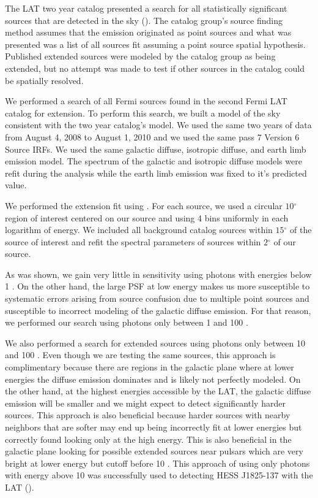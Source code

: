 \documentclass[12pt,preprint]{aastex}
\newcommand{\gev}{\text{GeV}\xspace}
\renewcommand{\deg}{\ensuremath{^\circ}\xspace}
\newcommand{\pointlike}{\text{\em pointlike}\xspace}
\begin{document}
The LAT two year catalog presented a search for all statistically
significant sources that are detected in the \gev sky (\cite{second_cat}).
The catalog group's source finding method assumes that the emission
originated as point sources and what was presented was a list of all
sources fit assuming a point source spatial hypothesis.  Published
extended sources were modeled by the catalog group as being extended,
but no attempt was made to test if other sources in the catalog could
be spatially resolved.

We performed a search of all Fermi sources found in the second Fermi LAT
catalog for extension.  To perform this search, we built a model of the
sky consistent with the two year catalog's model.   We used the same two
years of data from August 4, 2008 to August 1, 2010 and we used the same
pass 7 Version 6 Source IRFs.  We used the same galactic diffuse,
isotropic diffuse, and earth limb emission model. The spectrum of the
galactic and isotropic diffuse models were refit during the analysis
while the earth limb emission was fixed to it's predicted value.

We performed the extension fit using \pointlike.  For each source, we
used a circular $10\deg$ region of interest centered on our source and
using 4 bins uniformly in each logarithm of energy.  We included all
background catalog sources within $15\deg$ of the source of interest
and refit the spectral parameters of sources within $2\deg$ of our source.

As was shown, we gain very little in sensitivity using photons with energies
below 1 \gev. On the other hand, the large PSF at low energy makes us
more susceptible to systematic errors arising from source confusion due
to multiple point sources and susceptible to incorrect modeling of the
galactic diffuse emission.  For that reason, we performed our search
using photons only between 1 \gev and 100 \gev.

We also performed a search for extended sources using photons only between
10 \gev and 100 \gev. Even though we are testing the same sources, this
approach is complimentary because there are regions in the galactic
plane where at lower energies the diffuse emission dominates and is
likely not perfectly modeled. On the other hand, at the highest energies
accessible by the LAT, the galactic diffuse emission will be smaller and
we might expect to detect significantly harder sources. This approach is
also beneficial because harder sources with nearby neighbors that are
softer may end up being incorrectly fit at lower energies but correctly
found looking only at the high energy.  This is also beneficial in the
galactic plane looking for possible extended sources near pulsars which
are very bright at lower energy but cutoff before 10 \gev.  This approach
of using only photons with energy above 10 \gev was successfully used
to detecting HESS J1825-137 with the LAT (\cite{fermi_hess_j1825}).
\end{document}
